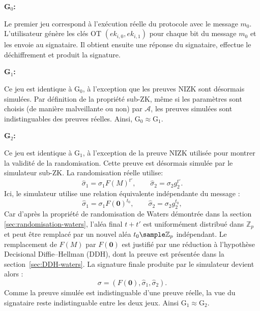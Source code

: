 \bigskip

\noindent\textbf{G$_0$:}

Le premier jeu correspond à l'exécution réelle du protocole avec le message $m_0$. L'utilisateur génère les clés OT $(ek_{i,0}, ek_{i,1})$ pour chaque bit du message $m_0$ et les envoie au signataire. Il obtient ensuite une réponse du signataire, effectue le déchiffrement et produit la signature.


\noindent\textbf{G$_1$:}

Ce jeu est identique à G$_0$, à l'exception que les preuves NIZK sont désormais simulées. Par définition de la propriété sub-ZK, même si les paramètres sont choisis (de manière malveillante ou non) par $\mathcal{A}$, les preuves simulées sont indistinguables des preuves réelles. Ainsi,
$\text{G}_0 \approx \text{G}_1$.


\noindent\textbf{G$_2$:}

Ce jeu est identique à G$_1$, à l'exception de la preuve NIZK utilisée
pour montrer la validité de la randomisation. Cette preuve est désormais
simulée par le simulateur sub-ZK. La randomisation réelle utilise:
\[
\widehat{\sigma}_1=\sigma_1F(M)^{t'},
\qquad
\widehat{\sigma}_2=\sigma_2g_2^{t'}.
\]
Ici, le simulateur utilise une relation équivalente indépendante
du message :
\[
\widehat{\sigma}_1=\sigma_1F(\mathbf{0})^{t_0},
\qquad
\widehat{\sigma}_2=\sigma_2g_2^{t_0},
\]
Car d'après la propriété de randomisation de Waters démontrée dans
la section \ref{sec:randomisation-waters}, l'aléa final $t+t'$ est
uniformément distribué dans $\mathbb{Z}_p$ et peut être remplacé par un
nouvel aléa $t_0\sample\mathbb{Z}_p$ indépendant.
Le remplacement de $F(M)$ par $F(\mathbf{0})$ est justifié par une 
réduction à l'hypothèse Decisional Diffie--Hellman (DDH),
dont la preuve est présentée dans la section~\ref{sec:DDH-waters}.
La signature finale produite par le simulateur devient alors :
\[
\sigma=(F(\mathbf{0}),\widehat{\sigma}_1,\widehat{\sigma}_2).
\]
Comme la preuve simulée est indistinguable d'une preuve réelle, 
la vue du signataire reste indistinguable entre les deux jeux.
Ainsi $\mathrm{G}_1\approx\mathrm{G}_2$.


